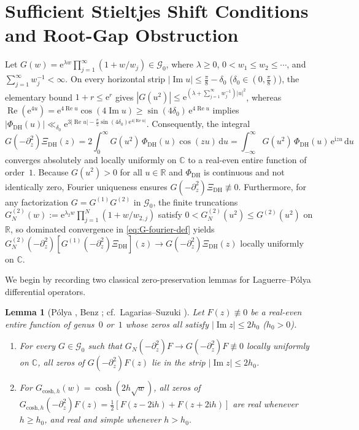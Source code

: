 \documentclass[11pt,a4paper,reqno]{amsart}
\newtheorem{lemma}[theorem]{Lemma}
\theoremstyle{definition}
\theoremstyle{remark}
\numberwithin{equation}{section}
\newcommand{\R}{\mathbb{R}}
\newcommand{\C}{\mathbb{C}}
\newcommand{\dd}{\mathrm{d}}
\newcommand{\ii}{\mathrm{i}}
\newcommand{\ee}{\mathrm{e}}
\DeclareMathOperator{\Reop}{Re}
\DeclareMathOperator{\Imop}{Im}
\begin{document}
\section{Sufficient Stieltjes Shift Conditions and Root-Gap Obstruction}
\label{sec:stieltjes}

Let $G(w) = \ee^{\lambda w}\prod_{j=1}^{\infty}(1 + w/w_j) \in \mathcal{G}_0$, where $\lambda \ge 0$, $0 < w_1 \le w_2 \le \cdots$, and $\sum_{j=1}^{\infty} w_j^{-1} < \infty$. On every horizontal strip $|\Imop u| \le \frac{\pi}{8} - \delta_0$ ($\delta_0 \in (0, \frac{\pi}{8})$), the elementary bound $1 + r \le \ee^r$ gives $|G(u^2)| \le \ee^{(\lambda + \sum_{j=1}^{\infty} w_j^{-1})|u|^2}$, whereas $\Reop(\ee^{4u}) = \ee^{4\Reop u}\cos(4\Imop u) \ge \sin(4\delta_0)\,\ee^{4\Reop u}$ implies $|\Phi_{\mathrm{DH}}(u)| \ll_{\delta_0} \ee^{3|\Reop u| - \frac{\pi}{5}\sin(4\delta_0)\ee^{4|\Reop u|}}$. Consequently, the integral
\begin{equation}
  G(-\partial_z^2)\Xi_{\mathrm{DH}}(z)
  = 2\int_{0}^{\infty} G(u^2)\,\Phi_{\mathrm{DH}}(u)\cos(zu)\,\dd u
  = \int_{-\infty}^{\infty} G(u^2)\,\Phi_{\mathrm{DH}}(u)\,\ee^{\ii z u}\,\dd u
  \label{eq:G-fourier-def}
\end{equation}
converges absolutely and locally uniformly on $\C$ to a real-even entire function of order~$1$. Because $G(u^2) > 0$ for all $u \in \R$ and $\Phi_{\mathrm{DH}}$ is continuous and not identically zero, Fourier uniqueness ensures $G(-\partial_z^2)\Xi_{\mathrm{DH}} \not\equiv 0$. Furthermore, for any factorization $G = G^{(1)}G^{(2)}$ in $\mathcal{G}_0$, the finite truncations $G_N^{(2)}(w) := \ee^{\lambda_2 w}\prod_{j=1}^{N}(1 + w/w_{2,j})$ satisfy $0 < G_N^{(2)}(u^2) \le G^{(2)}(u^2)$ on $\R$, so dominated convergence in \eqref{eq:G-fourier-def} yields $G_N^{(2)}(-\partial_z^2)[G^{(1)}(-\partial_z^2)\Xi_{\mathrm{DH}}](z) \to G(-\partial_z^2)\Xi_{\mathrm{DH}}(z)$ locally uniformly on $\C$.

We begin by recording two classical zero-preservation lemmas for Laguerre--P\'olya differential operators.

\begin{lemma}[{P\'olya \cite{polya1926,polya1927}, Benz \cite{benz1934}; cf.\ Lagarias--Suzuki \cite{lagariassuzuki2006}}]
\label{lem:hermite-biehler}
Let $F(z) \not\equiv 0$ be a real-even entire function of genus~$0$ or~$1$ whose zeros all satisfy $|\Imop z| \le 2h_0$ ($h_0 > 0$).
\begin{enumerate}[label=\textup{(\roman*)},leftmargin=2.0em]
  \item For every $G \in \mathcal{G}_0$ such that $G_N(-\partial_z^2)F \to G(-\partial_z^2)F \not\equiv 0$ locally uniformly on $\C$, all zeros of $G(-\partial_z^2)F(z)$ lie in the strip $|\Imop z| \le 2h_0$.
  \item For $G_{\mathrm{cosh},h}(w) = \cosh(2h\sqrt{w})$, all zeros of $G_{\mathrm{cosh},h}(-\partial_z^2)F(z) = \frac{1}{2}[F(z - 2\ii h) + F(z + 2\ii h)]$ are real whenever $h \ge h_0$, and real and simple whenever $h > h_0$.
\end{enumerate}
\end{lemma}
\end{document}
